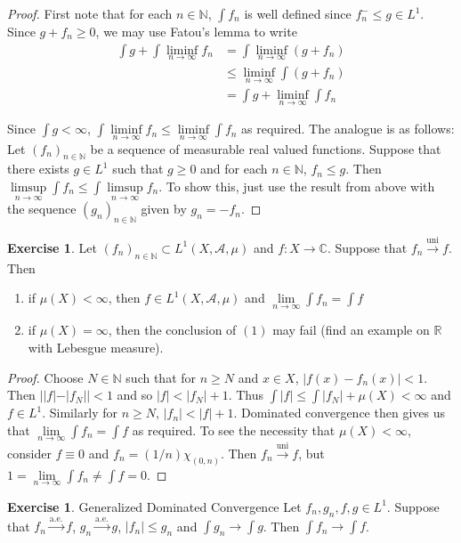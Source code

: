 \documentclass[12pt]{amsart}
\theoremstyle{definition}
\newtheorem{ex}[definition]{Exercise}
\newcommand{\C}{\mathbb{C}}
\newcommand{\N}{\mathbb{N}}
\newcommand{\R}{\mathbb{R}}
\newcommand{\MA}{\mathcal{A}}
\newcommand{\limfn}{\liminf \limits_{n \rightarrow \infty}}
\newcommand{\limpn}{\limsup \limits_{n \rightarrow \infty}}
\newcommand{\limn}{\lim \limits_{n \rightarrow \infty}}
\begin{document}
	\begin{proof}
		First note that for each $n \in \N$, $\int f_n$ is well defined since $f_n^- \leq g \in L^1$. Since $g + f_n \geq 0$, we may use Fatou's lemma to write
		\begin{align*}
			\int g + \int \limfn f_n
			&= \int \limfn (g+f_n) \\
			& \leq \limfn \int (g + f_n)\\
			&= \int g + \limfn \int f_n
		\end{align*}
		
		Since $\int g < \infty$, $\int \limfn f_n \leq \limfn \int f_n$ as required. The analogue is as follows: Let $(f_n)_{n \in \N}$ be a sequence of measurable real valued functions. Suppose that there exists $g \in L^1$ such that $g \geq 0$ and for each $n \in \N$, $f_n \leq g$. Then $\limpn \int f_n \leq \int \limpn f_n$. To show this, just use the result from above with the sequence $(g_n)_{n \in \N}$ given by $g_n = -f_n$.
		
	\end{proof}
	
	\begin{ex}
		Let $(f_n)_{n \in \N} \subset L^1(X, \MA, \mu)$ and $f:X \rightarrow \C$. Suppose that $f_n \xrightarrow{\text{uni}} f$. Then 
		\begin{enumerate}
			\item if $\mu(X) < \infty$, then $f \in L^1(X, \MA, \mu)$ and $\limn \int f_n = \int f$
			\item if $\mu(X) = \infty$, then the conclusion of $(1)$ may fail (find an example on $\R$ with Lebesgue measure).
		\end{enumerate}
	\end{ex}
	
	\begin{proof}
		Choose $N \in \N$ such that for $n \geq N$ and $x \in X$, $|f(x) - f_n(x)| < 1$. Then $||f| - |f_N|| < 1$ and so $|f| < |f_N| +1$. Thus $\int |f| \leq \int |f_N| +\mu(X) < \infty$ and $f \in L^1$. Similarly for $n \geq N$, $|f_n| < |f|+ 1$. Dominated convergence then gives us that $\limn \int f_n = \int f$ as required. To see the necessity that $\mu(X) < \infty$, consider $f \equiv 0$ and $f_n = (1/n) \chi_{(0,n)}$. Then $f_n \xrightarrow{\text{uni}} f$, but $1 = \limn \int f_n \neq \int f = 0$.  
	\end{proof}
	
	\begin{ex}{Generalized Dominated Convergence}
		Let $f_n,g_n,f,g \in L^1$. Suppose that $f_n \xrightarrow{\text{a.e.}} f$, $g_n \xrightarrow{\text{a.e.}} g$, $|f_n| \leq g_n$ and $\int g_n \rightarrow \int g$. Then $\int f_n \rightarrow \int f$.
	\end{ex}
	
\end{document}
